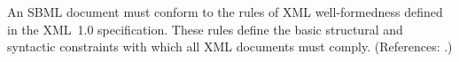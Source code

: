 An SBML document must conform to the rules of XML well-formedness defined
in the XML~1.0 specification.  These rules define the basic structural and
syntactic constraints with which all XML documents must comply.
(References: .)
